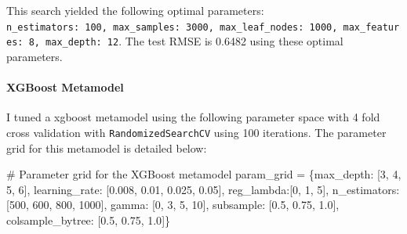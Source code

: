 \documentclass[
  letterpaper,
  DIV=11,
  numbers=noendperiod]{scrartcl}
\let\oldparagraph\paragraph
\renewcommand{\paragraph}[1]{\oldparagraph{#1}\mbox{}}
\newenvironment{Shaded}{\begin{snugshade}}{\end{snugshade}}
\newcommand{\CommentTok}[1]{\textcolor[rgb]{0.37,0.37,0.37}{#1}}
\newcommand{\DecValTok}[1]{\textcolor[rgb]{0.68,0.00,0.00}{#1}}
\newcommand{\FloatTok}[1]{\textcolor[rgb]{0.68,0.00,0.00}{#1}}
\newcommand{\NormalTok}[1]{\textcolor[rgb]{0.00,0.23,0.31}{#1}}
\newcommand{\OperatorTok}[1]{\textcolor[rgb]{0.37,0.37,0.37}{#1}}
\newcommand{\StringTok}[1]{\textcolor[rgb]{0.13,0.47,0.30}{#1}}
\begin{document}
This search yielded the following optimal parameters:
\texttt{\textquotesingle{}n\_estimators\textquotesingle{}:\ 100,\ \textquotesingle{}max\_samples\textquotesingle{}:\ 3000,\ \textquotesingle{}max\_leaf\_nodes\textquotesingle{}:\ 1000,\ \textquotesingle{}max\_features\textquotesingle{}:\ 8,\ \textquotesingle{}max\_depth\textquotesingle{}:\ 12}.
The test RMSE is 0.6482 using these optimal parameters.

\hypertarget{xgboost-metamodel}{%
\paragraph{XGBoost Metamodel}\label{xgboost-metamodel}}

I tuned a xgboost metamodel using the following parameter space with 4
fold cross validation with \texttt{RandomizedSearchCV} using 100
iterations. The parameter grid for this metamodel is detailed below:

\begin{Shaded}
\begin{Highlighting}[]
\CommentTok{\# Parameter grid for the XGBoost metamodel}
\NormalTok{param\_grid }\OperatorTok{=}\NormalTok{ \{}\StringTok{\textquotesingle{}max\_depth\textquotesingle{}}\NormalTok{: [}\DecValTok{3}\NormalTok{, }\DecValTok{4}\NormalTok{, }\DecValTok{5}\NormalTok{, }\DecValTok{6}\NormalTok{],}
              \StringTok{\textquotesingle{}learning\_rate\textquotesingle{}}\NormalTok{: [}\FloatTok{0.008}\NormalTok{, }\FloatTok{0.01}\NormalTok{, }\FloatTok{0.025}\NormalTok{, }\FloatTok{0.05}\NormalTok{],}
              \StringTok{\textquotesingle{}reg\_lambda\textquotesingle{}}\NormalTok{:[}\DecValTok{0}\NormalTok{, }\DecValTok{1}\NormalTok{, }\DecValTok{5}\NormalTok{],}
              \StringTok{\textquotesingle{}n\_estimators\textquotesingle{}}\NormalTok{:[}\DecValTok{500}\NormalTok{, }\DecValTok{600}\NormalTok{, }\DecValTok{800}\NormalTok{, }\DecValTok{1000}\NormalTok{],}
              \StringTok{\textquotesingle{}gamma\textquotesingle{}}\NormalTok{: [}\DecValTok{0}\NormalTok{, }\DecValTok{3}\NormalTok{, }\DecValTok{5}\NormalTok{, }\DecValTok{10}\NormalTok{],}
              \StringTok{\textquotesingle{}subsample\textquotesingle{}}\NormalTok{: [}\FloatTok{0.5}\NormalTok{, }\FloatTok{0.75}\NormalTok{, }\FloatTok{1.0}\NormalTok{],}
              \StringTok{\textquotesingle{}colsample\_bytree\textquotesingle{}}\NormalTok{: [}\FloatTok{0.5}\NormalTok{, }\FloatTok{0.75}\NormalTok{, }\FloatTok{1.0}\NormalTok{]\}}
\end{Highlighting}
\end{Shaded}
\end{document}
